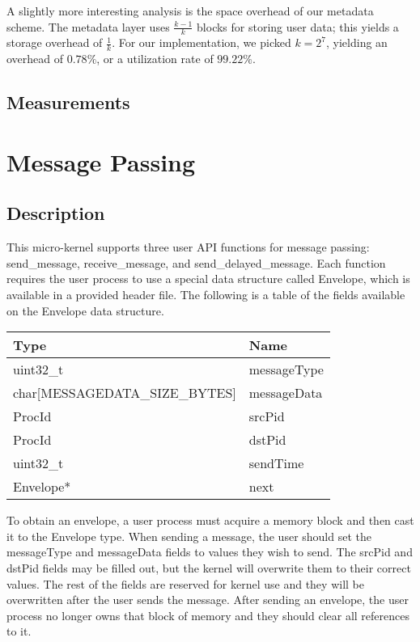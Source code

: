 \documentclass[12pt]{report}
\begin{document}
    A slightly more interesting analysis is the space overhead of our metadata
    scheme. The metadata layer uses $\frac{k-1}{k}$ blocks for storing user
    data; this yields a storage overhead of $\frac{1}{k}$. For our
    implementation, we picked $k=2^7$, yielding an overhead of $0.78\%$, or a
    utilization rate of $99.22\%$.

\section{Measurements}

\chapter{Message Passing}

\section{Description}

    This micro-kernel supports three user API functions for message passing:
    send\_message, receive\_message, and send\_delayed\_message. Each function
    requires the user process to use a special data structure called Envelope,
    which is available in a provided header file. The following is a table of the
    fields available on the Envelope data structure.

    \begin{tabular}{l | l}
        Type & Name \\
        \hline
        uint32\_t & messageType \\
        char[MESSAGEDATA\_SIZE\_BYTES] & messageData \\
        ProcId & srcPid \\
        ProcId & dstPid \\
        uint32\_t & sendTime \\
        Envelope* & next \\
    \end{tabular}

    To obtain an envelope, a user process must acquire a memory block and then
    cast  it to the Envelope type. When sending a message, the user should set
    the messageType and messageData fields to values they wish to send. The
    srcPid and dstPid fields may be filled out, but the kernel will overwrite
    them to their correct values. The rest of the fields are reserved for kernel
    use and they will be overwritten after the user sends the message.  After
    sending an envelope, the user process no longer owns that block of memory
    and they should clear all references to it.
\end{document}
